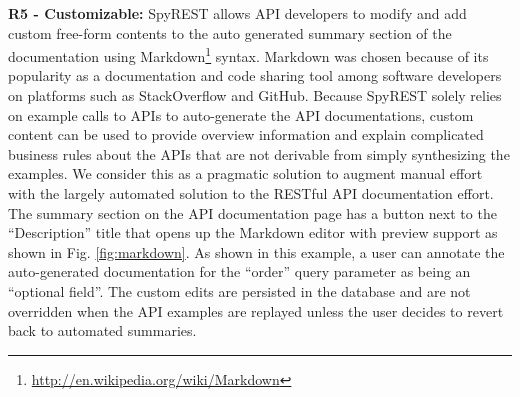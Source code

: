 \documentclass[conference]{IEEEtran}
\begin{document}
\textbf{R5 - Customizable:} SpyREST allows API developers to modify and add custom free-form contents to the auto generated summary section of the documentation using Markdown\footnote{\url{http://en.wikipedia.org/wiki/Markdown}} syntax. Markdown was chosen because of its popularity as a documentation and code sharing tool among software developers on platforms such as StackOverflow and GitHub. Because SpyREST solely relies on example calls to APIs to auto-generate the API documentations, custom content can be used to provide overview information and explain complicated business rules about the APIs that are not derivable from simply synthesizing the examples. We consider this as a pragmatic solution to augment manual effort with the largely automated solution to the RESTful API documentation effort. The summary section on the API documentation page has a button next to the ``Description'' title that opens up the Markdown editor with preview support as shown in Fig. \ref{fig:markdown}. As shown in this example, a user can annotate the auto-generated documentation for the ``order'' query parameter as being an ``optional field''. The custom edits are persisted in the database and are not overridden when the API examples are replayed unless the user decides to revert back to automated summaries.
\end{document}
